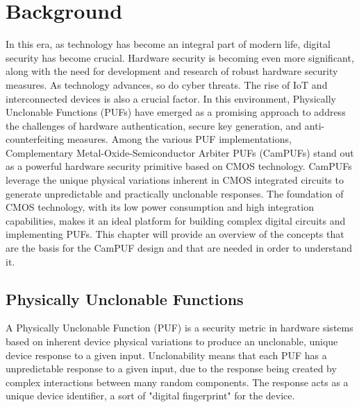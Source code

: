 \chapter{Background}
In this era, as technology has become an integral part of modern life, digital security has become crucial. Hardware security is becoming even more significant, along with the need for development and research of robust hardware security measures.
As technology advances, so do cyber threats. The rise of IoT and interconnected devices is also a crucial factor.
In this environment, Physically Unclonable Functions (PUFs) have emerged as a promising approach to address the challenges of hardware authentication, secure key generation, and anti-counterfeiting measures. Among the various PUF implementations, Complementary Metal-Oxide-Semiconductor Arbiter PUFs (CamPUFs) stand out as a powerful hardware security primitive based on CMOS technology.
CamPUFs leverage the unique physical variations inherent in CMOS integrated circuits to generate unpredictable and practically unclonable responses. The foundation of CMOS technology, with its low power consumption and high integration capabilities, makes it an ideal platform for building complex digital circuits and implementing PUFs.
This chapter will provide an overview of the concepts that are the basis for the CamPUF design and that are needed in order to understand it.

\section{Physically Unclonable Functions}
A Physically Unclonable Function (PUF) is a security metric in hardware sistems based on inherent device physical variations to produce an unclonable, 
unique device response to a given input. Unclonability means that each PUF has a unpredictable response to a given input, due to the response being created by complex interactions between many random components.
The response acts as a unique device identifier, a sort of "digital fingerprint" for the device.

